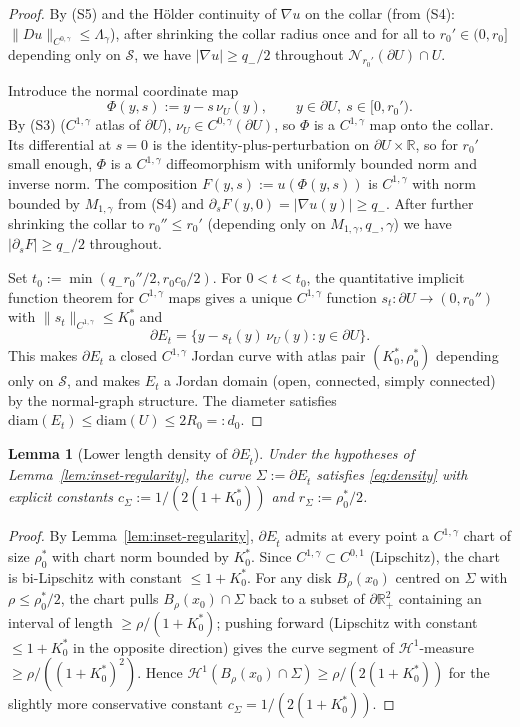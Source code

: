 \documentclass[11pt]{amsart}
\newtheorem{lemma}[theorem]{Lemma}
\newcommand{\R}{\mathbb R}
\newcommand{\Et}{E_{\hat t}}
\newcommand{\HH}{\mathcal H}
\newcommand{\Sclass}{\mathcal S}
\begin{document}
\begin{proof}
By (S5) and the Hölder continuity of $\nabla u$ on the collar
(from (S4): $\|Du\|_{C^{0,\gamma}}\le\Lambda_\gamma$), after shrinking
the collar radius once and for all to
$r_0'\in(0,r_0]$ depending only on $\Sclass$, we have
$|\nabla u|\ge q_-/2$ throughout $\mathcal N_{r_0'}(\partial U)\cap U$.

Introduce the normal coordinate map
\[
   \Phi(y,s):=y-s\,\nu_U(y),
   \qquad
   y\in\partial U,\ s\in[0,r_0').
\]
By (S3) ($C^{1,\gamma}$ atlas of $\partial U$), $\nu_U\in
C^{0,\gamma}(\partial U)$, so $\Phi$ is a $C^{1,\gamma}$ map onto the
collar.  Its differential at $s=0$ is the identity-plus-perturbation
on $\partial U\times\R$, so for $r_0'$ small enough, $\Phi$ is a
$C^{1,\gamma}$ diffeomorphism with uniformly bounded norm and inverse
norm.  The composition $F(y,s):=u(\Phi(y,s))$ is $C^{1,\gamma}$ with
norm bounded by $M_{1,\gamma}$ from (S4) and $\partial_s F(y,0)=
|\nabla u(y)|\ge q_-$.  After further shrinking the collar to
$r_0''\le r_0'$ (depending only on $M_{1,\gamma}, q_-,\gamma$) we have
$|\partial_s F|\ge q_-/2$ throughout.

Set $t_0:=\min(q_-r_0''/2,r_0 c_0/2)$.  For $0<t<t_0$, the
quantitative implicit function theorem for $C^{1,\gamma}$ maps gives
a unique $C^{1,\gamma}$ function $s_t:\partial U\to(0,r_0'')$ with
$\|s_t\|_{C^{1,\gamma}}\le K_0^*$ and
\[
   \partial E_t=\{y-s_t(y)\,\nu_U(y):y\in\partial U\}.
\]
This makes $\partial E_t$ a closed $C^{1,\gamma}$ Jordan curve with
atlas pair $(K_0^*,\rho_0^*)$ depending only on $\Sclass$, and makes
$E_t$ a Jordan domain (open, connected, simply connected) by the
normal-graph structure.  The diameter satisfies
$\mathrm{diam}(E_t)\le\mathrm{diam}(U)\le 2R_0=:d_0$.
\end{proof}

\begin{lemma}[Lower length density of $\partial\Et$]
\label{lem:density-quant}
Under the hypotheses of Lemma~\ref{lem:inset-regularity}, the curve
$\Sigma:=\partial \Et$ satisfies \eqref{eq:density} with explicit
constants $c_\Sigma:=1/(2(1+K_0^*))$ and $r_\Sigma:=\rho_0^*/2$.
\end{lemma}

\begin{proof}
By Lemma~\ref{lem:inset-regularity}, $\partial\Et$ admits at every
point a $C^{1,\gamma}$ chart of size $\rho_0^*$ with chart norm
bounded by $K_0^*$.  Since $C^{1,\gamma}\subset
C^{0,1}$ (Lipschitz), the chart is bi-Lipschitz with constant
$\le 1+K_0^*$.  For any disk $B_\rho(x_0)$ centred on $\Sigma$ with
$\rho\le\rho_0^*/2$, the chart pulls $B_\rho(x_0)\cap\Sigma$ back to
a subset of $\partial\R^2_+$ containing an interval of length
$\ge\rho/(1+K_0^*)$; pushing forward (Lipschitz with constant
$\le 1+K_0^*$ in the opposite direction) gives the curve segment of
$\HH^1$-measure $\ge\rho/((1+K_0^*)^2)$.  Hence
$\HH^1(B_\rho(x_0)\cap\Sigma)\ge\rho/(2(1+K_0^*))$ for the slightly
more conservative constant $c_\Sigma=1/(2(1+K_0^*))$.
\end{proof}
\end{document}
